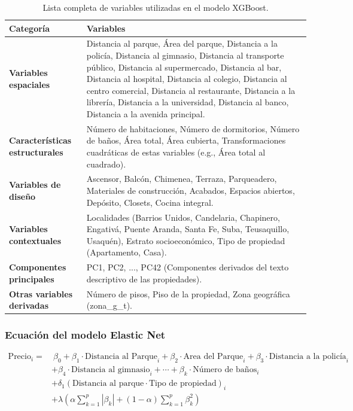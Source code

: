 \documentclass[a4paper]{article}
\theoremstyle{remark}
\theoremstyle{definition}
\begin{document}
\begin{table}[h!]
\centering
\begin{tabular}{l|p{12cm}}
\hline
\textbf{Categoría} & \textbf{Variables} \\ \hline
\textbf{Variables espaciales} & Distancia al parque, Área del parque, Distancia a la policía, Distancia al gimnasio, Distancia al transporte público, Distancia al supermercado, Distancia al bar, Distancia al hospital, Distancia al colegio, Distancia al centro comercial, Distancia al restaurante, Distancia a la librería, Distancia a la universidad, Distancia al banco, Distancia a la avenida principal. \\ \hline
\textbf{Características estructurales} & Número de habitaciones, Número de dormitorios, Número de baños, Área total, Área cubierta, Transformaciones cuadráticas de estas variables (e.g., Área total al cuadrado). \\ \hline
\textbf{Variables de diseño} & Ascensor, Balcón, Chimenea, Terraza, Parqueadero, Materiales de construcción, Acabados, Espacios abiertos, Depósito, Closets, Cocina integral. \\ \hline
\textbf{Variables contextuales} & Localidades (Barrios Unidos, Candelaria, Chapinero, Engativá, Puente Aranda, Santa Fe, Suba, Teusaquillo, Usaquén), Estrato socioeconómico, Tipo de propiedad (Apartamento, Casa). \\ \hline
\textbf{Componentes principales} & PC1, PC2, ..., PC42 (Componentes derivados del texto descriptivo de las propiedades). \\ \hline
\textbf{Otras variables derivadas} & Número de pisos, Piso de la propiedad, Zona geográfica (zona_g_t). \\ \hline
\end{tabular}
\caption{Lista completa de variables utilizadas en el modelo XGBoost.}
\label{tab:variables_modelo}
\end{table}

\subsubsection{Ecuación del modelo Elastic Net}


\begin{align*}
\text{Precio}_i = &\ \beta_0 + \beta_1 \cdot \text{Distancia al Parque}_i + \beta_2 \cdot \text{Area del Parque}_i + \beta_3 \cdot \text{Distancia a la policía}_i \\
& + \beta_4 \cdot \text{Distancia al gimnasio}_i + \cdots + \beta_k \cdot \text{Número de baños}_i \\
& + \delta_1 (\text{Distancia al parque} \cdot \text{Tipo de propiedad})_i \\
& + \lambda \left( \alpha \sum_{k=1}^{p} |\beta_k| + (1 - \alpha) \sum_{k=1}^{p} \beta_k^2 \right)
\end{align*}
\end{document}
